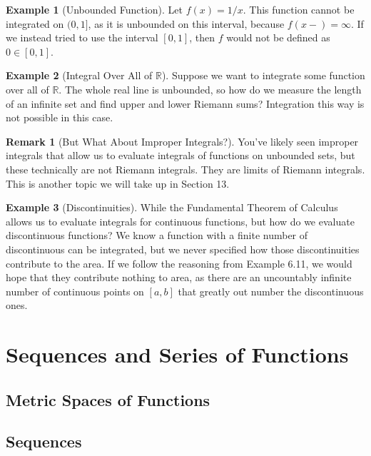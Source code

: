 \documentclass{article}
\newcommand{\R}{\mathbb{R}}
\theoremstyle{definition}
\newtheorem{example}{Example}[section]
\newtheorem{remark}{Remark}[section]
\begin{document}
\begin{example}[Unbounded Function]
	Let $ f(x)=1/x $. This function cannot be integrated on $ (0,1] $, as it is unbounded on this interval, because $ f(x-)=\infty $. If we instead tried to use the interval $ [0,1] $, then $ f $ would not be defined as $ 0\in[0,1] $.  
\end{example}
\begin{example}[Integral Over All of $ \R $]
	Suppose we want to integrate some function over all of $ \R $. The whole real line is unbounded, so how do we measure the length of an infinite set and find upper and lower Riemann sums? Integration this way is not possible in this case. 
\end{example}
\begin{remark}[But What About Improper Integrals?]
	You've likely seen improper integrals that allow us to evaluate integrals of functions on unbounded sets, but these technically are not Riemann integrals. They are limits of Riemann integrals. This is another topic we will take up in Section 13. 
\end{remark}
\begin{example}[Discontinuities]
While the Fundamental Theorem of Calculus allows us to evaluate integrals for continuous functions, but how do we evaluate discontinuous functions? We know a function with a finite number of discontinuous can be integrated, but we never specified how those discontinuities contribute to the area. If we follow the reasoning from Example 6.11, we would hope that they contribute nothing to area, as there are an uncountably infinite number of continuous points on $ [a,b] $ that greatly out number the discontinuous ones. 
\end{example}





\section{Sequences and Series of Functions}
\subsection{Metric Spaces of Functions}
\subsection{Sequences}
\end{document}
